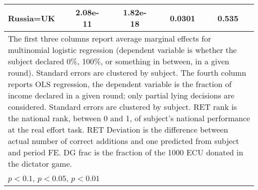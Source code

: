 \begin{tabular}{l|cccccc|cc}
Russia=UK       & 2.08e-11         &         & 1.82e-18         &         &   0.0301         &         &    0.535         &         \\
\hline\hline
\multicolumn{9}{p{16cm}}{\tiny The first three columns report average marginal effects for multinomial logistic regression (dependent variable is whether the subject declared 0\%, 100\%, or something in between, in a given round). Standard errors are clustered by subject. The fourth column reports OLS regression, the dependent variable is the fraction of income declared in a given round; only partial lying decisions are considered. Standard errors are clustered by subject. RET rank is the national rank, between 0 and 1, of subject's national performance at the real effort task. RET Deviation is the difference between actual number of correct additions and one predicted from subject and period FE. DG frac is the fraction of the 1000 ECU donated in the dictator game.}\\
\multicolumn{9}{l}{\tiny \sym{*} \(p<0.1\), \sym{**} \(p<0.05\), \sym{***} \(p<0.01\)}\\
\end{tabular}